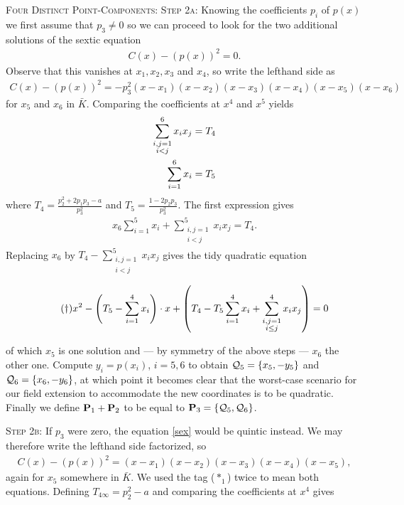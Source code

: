 \documentclass[english,11pt,a4paper]{article}
\begin{document}
\begin{case} {\scshape Four Distinct Point-Components:}
  {\scshape Step 2a:} Knowing the coefficients $p_i$ of $p(x)$ we first assume that $p_3 \neq 0$ so we can proceed to look for the two additional solutions of the sextic equation
  \begin{align*}
    \tag{$\ast$} \label{sex} C(x)-\left ( p(x) \right )^2 = 0.
  \end{align*}
  Observe that this vanishes at $x_1, x_2, x_3$ and $x_4$, so write the lefthand side as
  \begin{align}\tag{$*_1$}
    C(x)-(p(x))^2 = -p_3^2(x-x_1)(x-x_2)(x-x_3)(x-x_4)(x-x_5)(x-x_6)
  \end{align}
   for $x_5$ and $x_6$ in $\bar K$. Comparing the coefficients at $x^4$ and $x^5$ yields
  \begin{align*}
    \sum_{\substack{i,j=1\\i<j}}^6 x_i x_j &= T_4\\
    \rlap{\hspace{-56mm}and} \sum_{i=1}^6 x_i &= T_5
  \end{align*}
  where $T_4 = \frac{p_2^2+2 p_1 p_3-a}{p_3^2}$ and $T_5 = \frac{1-2 p_2 p_3}{p_3^2}$.
  The first expression gives
  \begin{align*}
    x_6 \sum_{i=1}^5 x_i + \sum_{\substack{i,j=1\\i<j}}^5 x_i x_j = T_4.
  \end{align*}
  Replacing $x_6$ by $T_4 - \sum_{\substack{i,j=1\\i<j}}^5 x_i x_j$ gives the tidy quadratic equation

  \vspace{-2mm}
  \fline
  \begin{align*}
    \tag{$\dag$} \label{dagger} x^2 - \left(T_5 - \sumfo \right) \cdot x+ \left(T_4 - T_5 \sumfo + \sum_{\substack{i,j=1\\i\leq j}}^4 x_i x_j \right) = 0
  \end{align*}
  \fline

  of which $x_5$ is one solution and --- by symmetry of the above steps --- $x_6$ the other one. Compute $y_i=p(x_i)$, $i=5,6$ to obtain $\q_5 = \{ x_5, -y_5 \}$ and $\q_6 = \{ x_6, -y_6 \}$, at which point it becomes clear that the worst-case scenario for our field extension to accommodate the new coordinates is to be quadratic. Finally we define $\P_1 + \P_2$ to be equal to $\P_3 = \{ \q_5, \q_6 \}$.

  {\scshape Step 2b:} If $p_3$ were zero, the equation \eqref{sex} would be quintic instead. We may therefore write the lefthand side factorized, so
  \begin{align}\tag{$*_1$}
  C(x) - (p(x))^2 =(x-x_1)(x-x_2)(x-x_3)(x-x_4)(x-x_5),
  \end{align}
  again for $x_5$ somewhere in $\bar K$. We used the tag ($*_1$) twice to mean both equations. Defining $T_{4\infty}=p_2^2 - a$ and comparing the coefficients at $x^4$ gives


\end{case}
\end{document}
